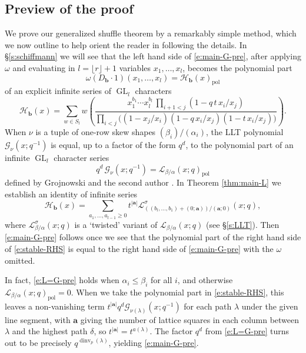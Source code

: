 \documentclass[12pt]{amsart}
\theoremstyle{definition}
\theoremstyle{remark}
\newcommand{\aA}{{\mathbf a}}
\newcommand{\bb}{{\mathbf b}}
\newcommand{\Gcal}{{\mathcal G}}
\newcommand{\Hcat}{{\mathcal H}}  %
\newcommand{\Lcal}{{\mathcal L}}
\DeclareMathOperator{\dinv}{dinv}
\DeclareMathOperator{\pol}{pol}
\DeclareMathOperator{\GL}{GL}
\begin{document}
\subsection{Preview of the proof}
\label{ss:proof-sketch}

We prove our generalized shuffle theorem by a remarkably simple
method, which we now outline to help orient the reader in following
the details.
In \S \ref{s:schiffmann} we will see that the left hand side of
\eqref{e:main-G-pre}, after applying $\omega $ and evaluating in $l =
\lfloor r \rfloor + 1$ variables $x_{1},\ldots,x_{l}$, becomes the
polynomial part
\begin{equation}\label{e:Db-Hb-pre}
\omega (D_{\bb } \cdot 1)(x_{1},\ldots,x_{l}) = \Hcat _{\bb }(x)_{\pol
}
\end{equation}
of an explicit infinite series of $\GL _{l}$ characters
\begin{equation}\label{e:Hb-pre}
\Hcat _{\bb }(x) =\sum _{w\in S_{l}} w \left(
\frac{x_{1}^{b_{1}}\cdots x_{l}^{b_{l}}\, \prod _{i+1<j}(1 - q\, t\,
x_{i}/x_{j})}{\prod _{i<j}\bigl((1-x_{j}/x_{i})(1 - q\, x_{i}/x_{j})(1
- t\, x_{i}/x_{j}) \bigr)} \right).
\end{equation}
When $\nu $ is a tuple of one-row skew shapes $(\beta _{i})/(\alpha
_{i})$, the LLT polynomial $\Gcal _{\nu }(x;q^{-1})$ is equal, up to a
factor of the form $q^{d}$, to the polynomial part of an infinite
$\GL_{l}$ character series
\begin{equation}\label{e:L=G-pre}
q^{d} \, \Gcal _{\nu }(x;q^{-1}) = \Lcal _{\beta /\alpha }(x;q)_{\pol
}
\end{equation}
defined by Grojnowski and the second author \cite{GrojHaim07}.  In
Theorem \ref{thm:main-L} we establish an identity of infinite series
\begin{equation}\label{e:stable-RHS}
\Hcat _{\bb }(x) = \sum _{a_{1},\ldots,a_{l-1}\geq 0} t^{|\aA |} \Lcal
^{\sigma }_{((b_{l},\ldots,b_{1})+(0;\aA ))/(\aA ;0)}(x;q),
\end{equation}
where $\Lcal ^{\sigma }_{\beta /\alpha }(x;q)$ is a `twisted' variant
of $\Lcal _{\beta /\alpha }(x;q)$ (see \S \ref{s:LLT}).  Then
\eqref{e:main-G-pre} follows once we see that the polynomial part of
the right hand side of \eqref{e:stable-RHS} is equal to the right hand
side of \eqref{e:main-G-pre} with the $\omega $ omitted.

In fact, \eqref{e:L=G-pre} holds when $\alpha _{i}\leq \beta _{i}$ for
all $i$, and otherwise $\Lcal _{\beta /\alpha }(x;q)_{\pol } = 0$.
When we take the polynomial part in \eqref{e:stable-RHS}, this leaves
a non-vanishing term $t^{|\aA |} q^{d} \Gcal _{\nu (\lambda
)}(x;q^{-1})$ for each path $\lambda $ under the given line segment,
with $\aA $ giving the number of lattice squares in each column
between $\lambda $ and the highest path $\delta $, so $t^{|\aA |} =
t^{a(\lambda )}$.  The factor $q^{d}$ from \eqref{e:L=G-pre} turns out
to be precisely $q^{\dinv _{p}(\lambda )}$, yielding
\eqref{e:main-G-pre}.
\end{document}
